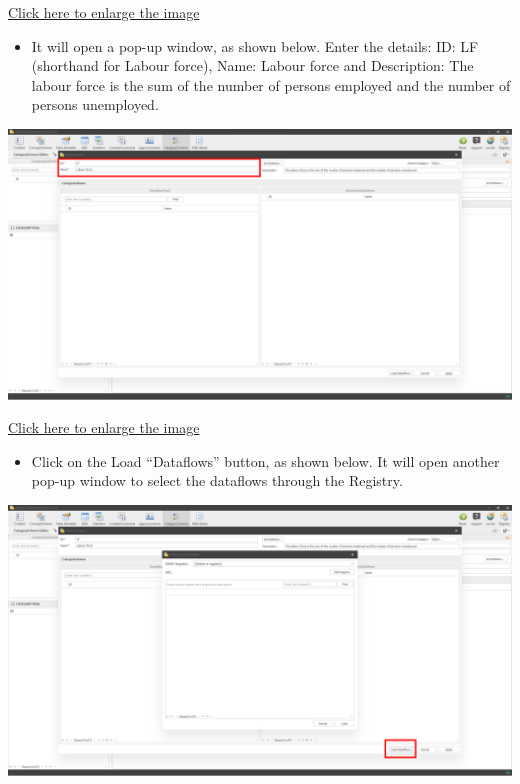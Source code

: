 \documentclass[
]{book}
\providecommand{\tightlist}{%
  \setlength{\itemsep}{0pt}\setlength{\parskip}{0pt}}
\begin{document}
\href{images/image162.png}{Click here to enlarge the image}

\begin{itemize}
\tightlist
\item
  It will open a pop-up window, as shown below. Enter the details: ID: LF (shorthand for Labour force), Name: Labour force and Description: The labour force is the sum of the number of persons employed and the number of persons unemployed.
\end{itemize}

\begin{center}\includegraphics[width=1\linewidth]{./images/image164} \end{center}

\href{images/image164.png}{Click here to enlarge the image}

\begin{itemize}
\tightlist
\item
  Click on the Load ``Dataflows'' button, as shown below. It will open another pop-up window to select the dataflows through the Registry.
\end{itemize}

\begin{center}\includegraphics[width=1\linewidth]{./images/image166} \end{center}
\end{document}
